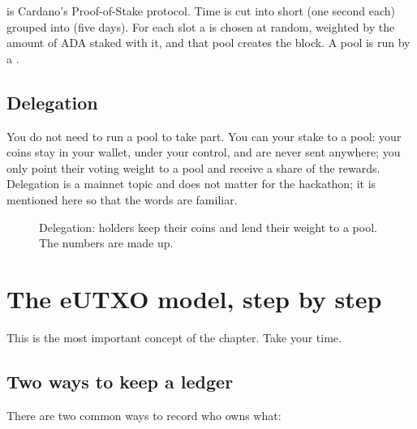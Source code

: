  is Cardano's Proof-of-Stake protocol. Time is cut into short  (one second each) grouped into  (five days). For each slot a  is chosen at random, weighted by the amount of ADA staked with it, and that pool creates the block. A pool is run by a .

\subsection{Delegation}
You do not need to run a pool to take part. You can  your stake to a pool: your coins stay in your wallet, under your control, and are never sent anywhere; you only point their voting weight to a pool and receive a share of the rewards. Delegation is a mainnet topic and does not matter for the hackathon; it is mentioned here so that the words are familiar.

\begin{figure}[h]
\centering
{}
\caption{Delegation: holders keep their coins and lend their weight to a pool. The numbers are made up.}
\end{figure}

\section{The eUTXO model, step by step}

This is the most important concept of the chapter. Take your time.

\subsection{Two ways to keep a ledger}
There are two common ways to record who owns what:

